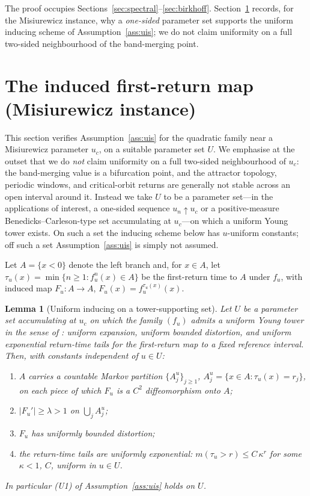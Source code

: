\documentclass[11pt,a4paper]{article}
\newtheorem{lemma}[theorem]{Lemma}
\theoremstyle{definition}
\begin{document}
The proof occupies Sections~\ref{sec:spectral}--\ref{sec:birkhoff}.
Section~\ref{sec:induced} records, for the Misiurewicz instance, why a
\emph{one-sided} parameter set supports the uniform inducing scheme of
Assumption~\ref{ass:uis}; we do not claim uniformity on a full
two-sided neighbourhood of the band-merging point.

\section{The induced first-return map (Misiurewicz instance)}
\label{sec:induced}

This section verifies Assumption~\ref{ass:uis} for the quadratic family
near a Misiurewicz parameter $u_c$, on a suitable parameter set $U$.
We emphasise at the outset that we do \emph{not} claim uniformity on a
full two-sided neighbourhood of $u_c$: the band-merging value is a
bifurcation point, and the attractor topology, periodic windows, and
critical-orbit returns are generally not stable across an open interval
around it. Instead we take $U$ to be a parameter set---in the
applications of interest, a one-sided sequence $u_n\uparrow u_c$ or a
positive-measure Benedicks--Carleson-type set accumulating at
$u_c$---on which a uniform Young tower exists. On such a set the
inducing scheme below has $u$-uniform constants; off such a set
Assumption~\ref{ass:uis} is simply not assumed.

Let $A = \{x < 0\}$ denote the left branch and, for $x \in A$, let
$\tau_u(x) = \min\{ n \geq 1 : f_u^n(x) \in A \}$ be the first-return
time to $A$ under $f_u$, with induced map
$F_u : A \to A$, $F_u(x) = f_u^{\tau_u(x)}(x)$.

\begin{lemma}[Uniform inducing on a tower-supporting set]
\label{lem:induced}
Let $U$ be a parameter set accumulating at $u_c$ on which the family
$(f_u)$ admits a uniform Young tower in the sense of
\cite{young1992decay}: uniform expansion, uniform bounded distortion,
and uniform exponential return-time tails for the first-return map to a
fixed reference interval. Then, with constants independent of $u\in U$:
\begin{enumerate}
\item[\textup{(i)}] $A$ carries a countable Markov partition
$\{A_j^u\}_{j \geq 1}$, $A_j^u = \{x \in A : \tau_u(x) = r_j\}$, on
each piece of which $F_u$ is a $C^2$ diffeomorphism onto $A$;
\item[\textup{(ii)}] $|F_u'| \geq \lambda > 1$ on $\bigcup_j A_j^u$;
\item[\textup{(iii)}] $F_u$ has uniformly bounded distortion;
\item[\textup{(iv)}] the return-time tails are uniformly exponential:
$m(\tau_u > r) \le C\,\kappa^{r}$ for some $\kappa<1$, $C$, uniform in
$u\in U$.
\end{enumerate}
In particular (U1) of Assumption~\ref{ass:uis} holds on $U$.
\end{lemma}
\end{document}
